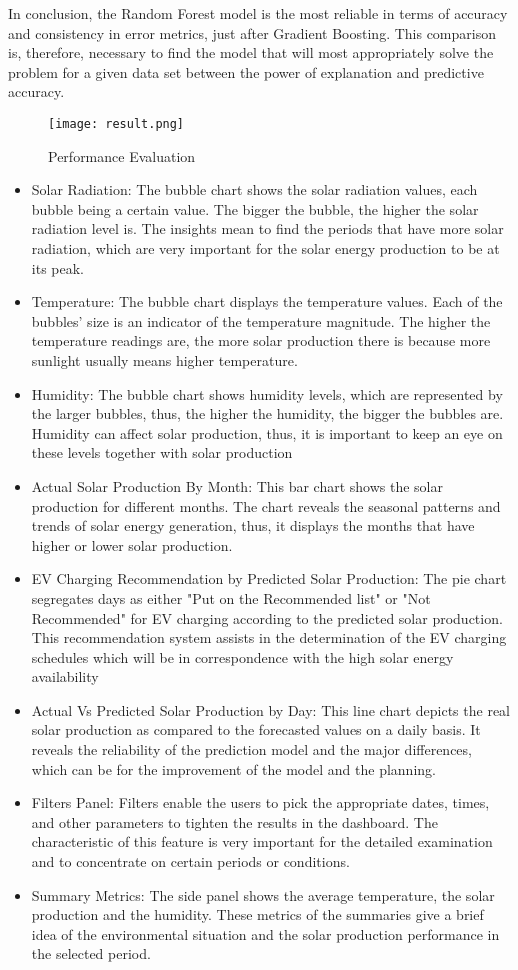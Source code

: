 \documentclass[conference]{IEEEtran}
\begin{document}
In conclusion, the Random Forest model is the most reliable in terms of accuracy and consistency in error metrics, just after Gradient Boosting. This comparison is, therefore, necessary to find the model that will most appropriately solve the problem for a given data set between the power of explanation and predictive accuracy.
\begin{figure}[H] %
    \centering
    \texttt{[image: result.png]}
    \caption{Performance Evaluation}
    \label{fig:technical_workflow}
\end{figure}
\begin{itemize}
\item Solar Radiation: The bubble chart shows the solar radiation values, each bubble being a certain value. The bigger the bubble, the higher the solar radiation level is. The insights mean to find the periods that have more solar radiation, which are very important for the solar energy production to be at its peak.
\item Temperature: The bubble chart displays the temperature values. Each of the bubbles' size is an indicator of the temperature magnitude. The higher the temperature readings are, the more solar production there is because more sunlight usually means higher temperature.
\item  Humidity: The bubble chart shows humidity levels, which are represented by the larger bubbles, thus, the higher the humidity, the bigger the bubbles are. Humidity can affect solar production, thus, it is important to keep an eye on these levels together with solar production
\item Actual Solar Production By Month: This bar chart shows the solar production for different months. The chart reveals the seasonal patterns and trends of solar energy generation, thus, it displays the months that have higher or lower solar production.
\item EV Charging Recommendation by Predicted Solar Production: The pie chart segregates days as either "Put on the Recommended list" or "Not Recommended" for EV charging according to the predicted solar production. This recommendation system assists in the determination of the EV charging schedules which will be in correspondence with the high solar energy availability
\item Actual Vs Predicted Solar Production by Day: This line chart depicts the real solar production as compared to the forecasted values on a daily basis. It reveals the reliability of the prediction model and the major differences, which can be for the improvement of the model and the planning.
\item Filters Panel: Filters enable the users to pick the appropriate dates, times, and other parameters to tighten the results in the dashboard. The characteristic of this feature is very important for the detailed examination and to concentrate on certain periods or conditions.
\item Summary Metrics: The side panel shows the average temperature, the solar production and the humidity. These metrics of the summaries give a brief idea of the environmental situation and the solar production performance in the selected period.


\end{itemize}
\end{document}
